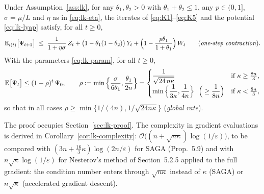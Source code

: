 \begin{theorem}\label{thm:lk}
Under Assumption~\ref{ass:lk}, for any $\theta_1,\theta_2>0$ with $\theta_1+\theta_2\le1$, any $p\in(0,1]$, $\sigma=\mu/L$ and $\eta$ as in \eqref{eq:lk-eta}, the iterates of \eqref{eq:K1}--\eqref{eq:K5} and the potential \eqref{eq:lk-lyap} satisfy, for all $t\ge0$,
\begin{equation}\label{ineq:contraction}
\mathbb{E}_{i(t)}\big[\Psi_{t+1}\big]\;\le\;\frac1{1+\eta\sigma}\,Z_t+\big(1-\theta_1(1-\theta_2)\big)\,Y_t+\Big(1-\frac{p\theta_1}{1+\theta_1}\Big)\,W_t
\qquad\text{(\emph{one-step contraction}).}
\end{equation}
With the parameters \eqref{eq:lk-param}, for all $t\ge0$,
\begin{equation}\label{ineq:rate}
\mathbb{E}\big[\Psi_t\big]\le(1-\rho)^t\,\Psi_0,\qquad \rho:=\min\Big\{\frac{\sigma}{6\theta_1},\frac{\theta_1}{2n}\Big\}
=\begin{cases}\dfrac1{\sqrt{24\,n\kappa}} & \text{if } \kappa\ge\tfrac{8n}{3},\\[2mm] \min\Big\{\dfrac1{3\kappa},\dfrac1{4n}\Big\}\ \ \Big(\ge\dfrac1{8n}\Big) & \text{if } \kappa<\tfrac{8n}{3},\end{cases}
\end{equation}
so that in all cases $\rho\ge\min\{1/(4n),1/\sqrt{24n\kappa}\}$ (\emph{global rate}).
\end{theorem}

The proof occupies Section~\ref{sec:lk-proof}. The complexity in gradient evaluations is derived in Corollary~\ref{cor:lk-complexity}: $\mathcal O\big((n+\sqrt{n\kappa})\log(1/\varepsilon)\big)$, to be compared with $(3n+\frac{16}{3}\kappa)\log(2n/\varepsilon)$ for SAGA (Prop.~5.9) and with $n\sqrt\kappa\log(1/\varepsilon)$ for Nesterov's method of Section~5.2.5 applied to the full gradient: the condition number enters through $\sqrt{n\kappa}$ instead of $\kappa$ (SAGA) or $n\sqrt\kappa$ (accelerated gradient descent).

